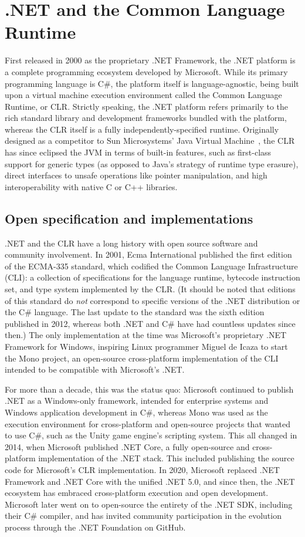 \section{.NET and the Common Language Runtime}
First released in 2000 as the proprietary .NET Framework, the .NET platform is a complete programming ecosystem developed by Microsoft.
While its primary programming language is C\#, the platform itself is language-agnostic,
being built upon a virtual machine execution environment called the Common Language Runtime, or CLR.
Strictly speaking, the .NET platform refers primarily to the rich standard library and development frameworks bundled with the platform,
whereas the CLR itself is a fully independently-specified runtime.
Originally designed as a competitor to Sun Microsystems' Java Virtual Machine~\cite{20yrsdotnet},
the CLR has since eclipsed the JVM in terms of built-in features, such as first-class support for generic types
(as opposed to Java's strategy of runtime type erasure), direct interfaces to unsafe operations like pointer manipulation,
and high interoperability with native C or C++ libraries.

\subsection{Open specification and implementations}
.NET and the CLR have a long history with open source software and community involvement.
In 2001, Ecma International published the first edition of the ECMA-335 standard, which codified the Common Language Infrastructure (CLI):
a collection of specifications for the language runtime, bytecode instruction set, and type system implemented by the CLR.
(It should be noted that editions of this standard do \textit{not} correspond to specific versions of the .NET distribution or the C\# language.
The last update to the standard was the sixth edition published in 2012, whereas both .NET and C\# have had countless updates since then.)
The only implementation at the time was Microsoft's proprietary .NET Framework for Windows, inspiring Linux programmer Miguel de Icaza
to start the Mono project, an open-source cross-platform implementation of the CLI intended to be compatible with Microsoft's .NET.

For more than a decade, this was the status quo: Microsoft continued to publish .NET as a Windows-only framework, intended for enterprise systems and Windows
application development in C\#, whereas Mono was used as the execution environment for cross-platform and open-source projects that wanted to use C\#,
such as the Unity game engine's scripting system. %
This all changed in 2014, when Microsoft published .NET Core, a fully open-source and cross-platform implementation of the .NET stack.
This included publishing the source code for Microsoft's CLR implementation.
In 2020, Microsoft replaced .NET Framework and .NET Core with the unified .NET 5.0, and since then, the .NET ecosystem has embraced
cross-platform execution and open development.
Microsoft later went on to open-source the entirety of the .NET SDK, including their C\# compiler,
and has invited community participation in the evolution process through the .NET Foundation on GitHub.

